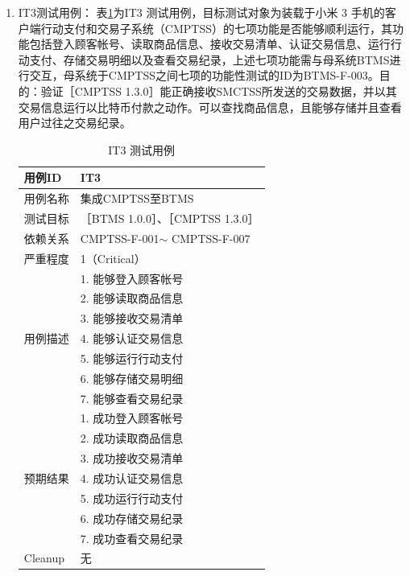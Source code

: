 \begin{enumerate}
\begin{enumerate}
				\item IT3测试用例：
					表\ref{IT3TestCase}为IT3 测试用例，目标测试对象为装载于小米 3 手机的客户端行动支付和交易子系统（CMPTSS）的七项功能是否能够顺利运行，其功能包括登入顾客帐号、读取商品信息、接收交易清单、认证交易信息、运行行动支付、存储交易明细以及查看交易纪录，上述七项功能需与母系统BTMS进行交互，母系统于CMPTSS之间七项的功能性测试的ID为BTMS-F-003。目的：验证［CMPTSS 1.3.0］能正确接收SMCTSS所发送的交易数据，并以其交易信息运行以比特币付款之动作。可以查找商品信息，且能够存储并且查看用户过往之交易纪录。

						\begin{table}[!htbp]
						\caption{IT3 测试用例} %
						\centering %
						\label{IT3TestCase} %
						\begin{tabular}{|l|l|}
						\hline
						用例ID & IT3 \\ \hline
						用例名称 & 集成CMPTSS至BTMS \\ \hline
						测试目标 & {［}BTMS 1.0.0{］}、{［}CMPTSS 1.3.0{］} \\ \hline
						依赖关系 & CMPTSS-F-001$\sim$ CMPTSS-F-007 \\ \hline
						严重程度 & 1（Critical） \\ \hline
						\multirow{7}{*}{用例描述} & 1.     能够登入顾客帐号 \\ \cline{2-2} 
						 & 2.     能够读取商品信息 \\ \cline{2-2} 
						 & 3.     能够接收交易清单 \\ \cline{2-2} 
						 & 4.     能够认证交易信息 \\ \cline{2-2} 
						 & 5.     能够运行行动支付 \\ \cline{2-2} 
						 & 6.     能够存储交易明细 \\ \cline{2-2} 
						 & 7.     能够查看交易纪录 \\ \hline
						\multirow{7}{*}{预期结果} & 1.     成功登入顾客帐号 \\ \cline{2-2} 
						 & 2.     成功读取商品信息 \\ \cline{2-2} 
						 & 3.     成功接收交易清单 \\ \cline{2-2} 
						 & 4.     成功认证交易信息 \\ \cline{2-2} 
						 & 5.     成功运行行动支付 \\ \cline{2-2} 
						 & 6.     成功存储交易纪录 \\ \cline{2-2} 
						 & 7.     成功查看交易纪录 \\ \hline
						Cleanup & 无 \\ \hline
						\end{tabular}
						\end{table}
				\end{enumerate}


\end{enumerate}
